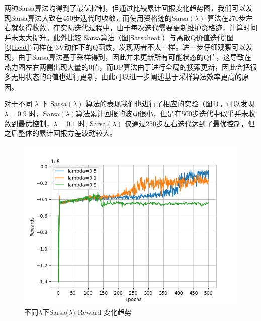 \documentclass[conference,10pt]{IEEEtran}
\begin{document}
两种Sarsa算法均得到了最优控制，但通过比较累计回报变化趋势图，我们可以发现Sarsa算法大致在450步迭代时收敛，而使用资格迹的Sarsa$(\lambda)$ 算法在270步左右就获得收敛。在实际迭代过程中，由于每次迭代需要更新维护资格迹，计算时间并未太大提升。此外比较 Sarsa算法（图\ref{Sarsaheat}）与离散Q价值迭代(图\ref{QIheat})同样在-3V动作下的Q函数，发现两者不太一样。进一步仔细观察可以发现，由于Sarsa算法基于采样得到，因此并未更新所有可能状态的Q值，这导致在热力图左右两侧出现大量的0值，而DP算法由于进行全局的搜索更新，因此会把很多无用状态的Q值也进行更新，由此可以进一步阐述基于采样算法效率更高的原因。

对于不同 $\lambda$ 下 Sarsa$(\lambda)$ 算法的表现我们也进行了相应的实验（图\ref{diff-lam}）。可以发现 $\lambda=0.9$ 时，Sarsa$(\lambda)$算法累计回报的波动很小，但是在500步迭代中似乎并未收敛到最优控制，$\lambda=0.1$ 时, Sarsa$(\lambda)$ 仅通过250步左右迭代达到了最优控制，但之后整体的累计回报方差波动较大。
\begin{figure}[H]
	\centering
	\includegraphics[scale=0.25]{./figure/diff-lam.png}
	\caption{不同$\lambda$下Sarsa($\lambda$) Reward 变化趋势}
	\label{diff-lam}
\end{figure}
\end{document}
